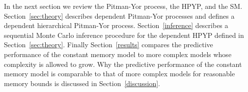 In the next section we review the Pitman-Yor process, the HPYP, and the SM.   Section~\ref{sec:theory} describes dependent Pitman-Yor processes and defines a dependent hierarchical Pitman-Yor process.   Section~\ref{inference} describes a sequential Monte Carlo inference procedure for the dependent HPYP defined in Section~\ref{sec:theory}.  Finally  Section~\ref{results} compares the predictive performance of the constant memory model to more complex models whose complexity is allowed to grow.  Why the predictive performance of the constant memory model is comparable to that of more complex models for reasonable memory bounds is discussed in Section~\ref{discussion}.




